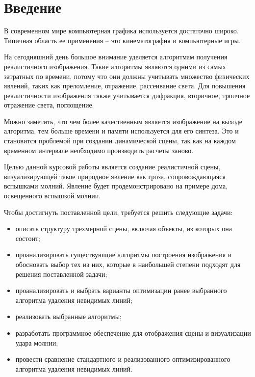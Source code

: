 \chapter*{Введение}

В современном мире компьютерная графика используется достаточно широко. Типичная область ее применения – это кинематография и компьютерные игры.

На сегодняшний день большое внимание уделяется алгоритмам получения реалистичного изображения. Такие алгоритмы являются одними из самых затратных по времени, потому что они должны учитывать множество физических явлений, таких как преломление, отражение, рассеивание света. Для повышения реалистичности изображения также учитывается дифракция, вторичное, троичное отражение света, поглощение. 

Можно заметить, что чем более качественным является изображение на выходе алгоритма, тем больше времени и памяти используется для его синтеза. Это и становится проблемой при создании динамической сцены, так как на каждом временном интервале необходимо производить расчеты заново. 

Целью данной курсовой работы является создание реалистичной сцены, визуализирующей такое природное явление как гроза, сопровождающаяся вспышками молний. Явление будет продемонстрировано на примере дома, освещенного вспышкой молнии.

Чтобы достигнуть поставленной цели, требуется решить следующие задачи:

\begin{itemize}
	\item описать структуру трехмерной сцены, включая объекты, из которых она состоит;
    \item проанализировать существующие алгоритмы построения изображения и обосновать выбор тех из них, которые в наибольшей степени подходят для решения поставленной задачи;
    \item проанализировать и выбрать варианты оптимизации ранее выбранного алгоритма удаления невидимых линий;
    \item реализовать выбранные алгоритмы;
    \item разработать программное обеспечение для отображения сцены и визуализации удара молнии; 
    \item провести сравнение стандартного и реализованного оптимизированного алгоритма удаления невидимых линий.
\end{itemize}
